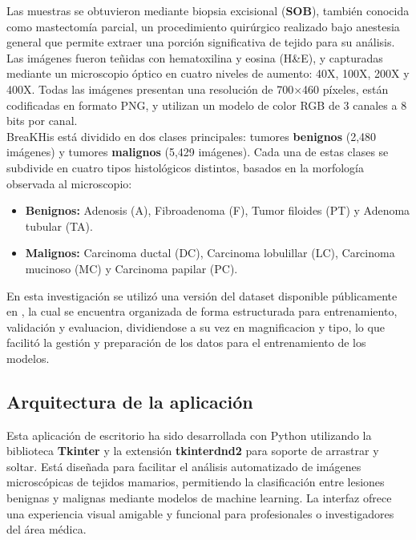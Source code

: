 \documentclass[12pt]{article} %
\begin{document}
Las muestras se obtuvieron mediante biopsia excisional (\textbf{SOB}), también conocida como mastectomía parcial, un procedimiento quirúrgico realizado bajo anestesia general que permite extraer una porción significativa de tejido para su análisis. Las imágenes fueron teñidas con hematoxilina y eosina (H\&E), y capturadas mediante un microscopio óptico en cuatro niveles de aumento: 40X, 100X, 200X y 400X. Todas las imágenes presentan una resolución de 700×460 píxeles, están codificadas en formato PNG, y utilizan un modelo de color RGB de 3 canales a 8 bits por canal. \\

BreaKHis está dividido en dos clases principales: tumores \textbf{benignos} (2,480 imágenes) y tumores \textbf{malignos} (5,429 imágenes). Cada una de estas clases se subdivide en cuatro tipos histológicos distintos, basados en la morfología observada al microscopio: \\

\begin{itemize}
    \item \textbf{Benignos:} Adenosis (A), Fibroadenoma (F), Tumor filoides (PT) y Adenoma tubular (TA).
    \item \textbf{Malignos:} Carcinoma ductal (DC), Carcinoma lobulillar (LC), Carcinoma mucinoso (MC) y Carcinoma papilar (PC).
\end{itemize}

En esta investigación se utilizó una versión del dataset disponible públicamente en \cite{google_drive_folder}, la cual se encuentra organizada de forma estructurada para entrenamiento, validación y evaluacion, dividiendose a su vez en magnificacion y tipo, lo que facilitó la gestión y preparación de los datos para el entrenamiento de los modelos. \\

\subsection{Arquitectura de la aplicación}
Esta aplicación de escritorio ha sido desarrollada con Python utilizando la biblioteca \textbf{Tkinter} y la extensión \textbf{tkinterdnd2} para soporte de arrastrar y soltar. Está diseñada para facilitar el análisis automatizado de imágenes microscópicas de tejidos mamarios, permitiendo la clasificación entre lesiones benignas y malignas mediante modelos de machine learning. La interfaz ofrece una experiencia visual amigable y funcional para profesionales o investigadores del área médica.\\
\end{document}
